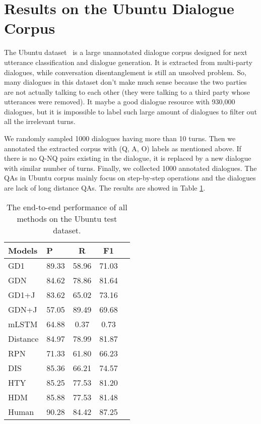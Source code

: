 \section{Results on the Ubuntu Dialogue Corpus}
\label{sec:results}

The Ubuntu dataset~\cite{lowe2015ubuntu} is a large unannotated dialogue corpus designed for next utterance classification and dialogue generation. It is extracted from multi-party dialogues, while conversation disentanglement is still an unsolved problem. So, many dialogues in this dataset don't make much 
sense because the two parties are not actually talking to each other (they were
talking to a third party whose utterances were removed). 
It maybe a good dialogue resource with 930,000 dialogues, but it is 
impossible to label such large amount of dialogues to filter out all
the irrelevant turns.

We randomly sampled 1000 dialogues having more than 10 turns. Then we annotated the extracted corpus with (Q, A, O) labels as mentioned above. If there is no Q-NQ pairs existing in the dialogue, it is replaced by a new dialogue with similar number of turns. Finally, we collected 1000 annotated dialogues. The QAs in Ubuntu corpus mainly focus on step-by-step operations and the dialogues are lack of long distance QAs. The results are showed in Table \ref{tab:mainResults-ubuntu}.

\begin{table}[th]
	\scriptsize
	\centering
	\begin{tabular}{p{1cm}<{\centering}p{1cm}<{\centering}ccc}
		\toprule[1.5pt]
		Models &P&R& F1\\
		\midrule[1pt]
		GD1&89.33&58.96&71.03\\
		GDN  &84.62&78.86&81.64\\
		GD1+J&83.62&65.02&73.16\\
		GDN+J&57.05&89.49&69.68\\
		\hline
		mLSTM&64.88&0.37&0.73\\
		Distance&84.97&78.99&81.87\\
		RPN&71.33&61.80&66.23\\
		\hline
		DIS&85.36&66.21&74.57\\
		HTY&85.25&77.53&81.20\\
		HDM&85.88&77.53&81.48\\
		\hline
		Human &90.28&84.42&87.25\\
		\bottomrule[1.5pt]
	\end{tabular}
	\vspace{-0.25cm}
	\caption{The end-to-end performance of all methods on the Ubuntu test dataset.}
	\label{tab:mainResults-ubuntu}
\end{table}

